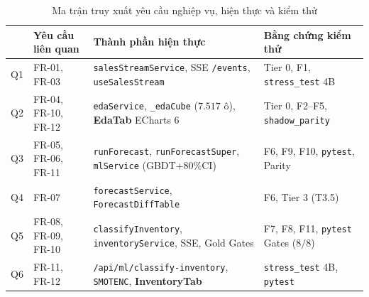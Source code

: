 \begin{table}[H]
	\centering
	\footnotesize
	\begin{tabular}{c | l p{5.8cm} l}
		\toprule
		{} & \textbf{Yêu cầu liên quan} & \textbf{Thành phần hiện thực}                                                                                                       & \textbf{Bằng chứng kiểm thử}                                             \\
		\midrule
		Q1       & FR-01, FR-03               & \texttt{salesStreamService}, SSE \texttt{/events}, \texttt{useSalesStream}                & Tier 0, F1, \texttt{stress_test} 4B                \\
		Q2       & FR-04, FR-10, FR-12        & \texttt{edaService}, \texttt{_edaCube} ($7.517$ ô), \textbf{EdaTab} ECharts 6                             & Tier 0, F2--F5, \texttt{shadow_parity}                   \\
		Q3       & FR-05, FR-06, FR-11        & \texttt{runForecast}, \texttt{runForecastSuper}, \texttt{mlService} (GBDT+$80\%$CI) & F6, F9, F10, \texttt{pytest}, Parity                     \\
		Q4       & FR-07                      & \texttt{forecastService}, \texttt{ForecastDiffTable}                                                & F6, Tier 3 (T3.5)                                                  \\
		Q5       & FR-08, FR-09, FR-10        & \texttt{classifyInventory}, \texttt{inventoryService}, SSE, Gold Gates                              & F7, F8, F11, \texttt{pytest} Gates ($8/8$)               \\
		Q6       & FR-11, FR-12               & \texttt{/api/ml/classify-inventory}, \texttt{SMOTENC}, \textbf{InventoryTab}                                  & \texttt{stress_test} 4B, \texttt{pytest} \\
		\bottomrule
	\end{tabular}
	\caption{Ma trận truy xuất yêu cầu nghiệp vụ, hiện thực và kiểm thử}
	\label{tab:traceability}
\end{table}

